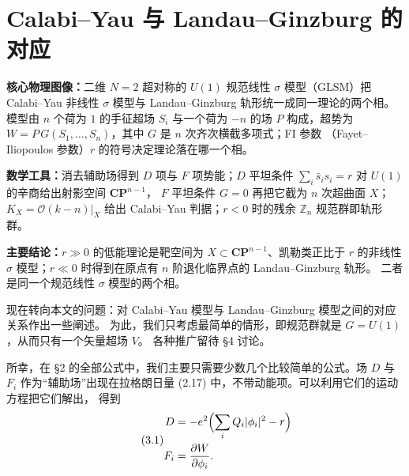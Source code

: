 

\section{Calabi--Yau 与 Landau--Ginzburg 的对应}

\begin{keytakeaway}
\textbf{核心物理图像：}二维 $N=2$ 超对称的 $U(1)$ 规范线性 $\sigma$ 模型（GLSM）把
Calabi--Yau 非线性 $\sigma$ 模型与 Landau--Ginzburg 轨形统一成同一理论的两个相。
模型由 $n$ 个荷为 $1$ 的手征超场 $S_i$ 与一个荷为 $-n$ 的场 $P$ 构成，超势为
$W=P\,G(S_1,\dots,S_n)$，其中 $G$ 是 $n$ 次齐次横截多项式；FI 参数
（Fayet--Iliopoulos 参数）$r$ 的符号决定理论落在哪一个相。

\par\textbf{数学工具：}消去辅助场得到 $D$ 项与 $F$ 项势能；$D$ 平坦条件
$\sum_i\bar s_is_i=r$ 对 $U(1)$ 的辛商给出射影空间 $\mathbf{CP}^{n-1}$，
$F$ 平坦条件 $G=0$ 再把它截为 $n$ 次超曲面 $X$；$K_X=\mathcal{O}(k-n)|_X$
给出 Calabi--Yau 判据；$r<0$ 时的残余 $\mathbb{Z}_n$ 规范群即轨形群。

\par\textbf{主要结论：}$r\gg0$ 的低能理论是靶空间为 $X\subset\mathbf{CP}^{n-1}$、凯勒类正比于 $r$
的非线性 $\sigma$ 模型；$r\ll0$ 时得到在原点有 $n$ 阶退化临界点的 Landau--Ginzburg 轨形。
二者是同一个规范线性 $\sigma$ 模型的两个相。
\end{keytakeaway}

现在转向本文的问题：对 Calabi--Yau 模型与 Landau--Ginzburg 模型之间的对应关系作出一些阐述。
为此，我们只考虑最简单的情形，即规范群就是 $G=U(1)$，从而只有一个矢量超场 $V$。
各种推广留待 §4 讨论。

所幸，在 §2 的全部公式中，我们主要只需要少数几个比较简单的公式。场 $D$ 与 $F_i$
作为“辅助场”出现在拉格朗日量 (2.17) 中，不带动能项。可以利用它们的运动方程把它们解出，
得到
\begin{equation}
\tag{3.1}
\begin{aligned}
D &= -e^2\Bigl(\sum_i Q_i|\phi_i|^2-r\Bigr)\\
F_i &= \frac{\partial W}{\partial\phi_i}.
\end{aligned}
\end{equation}

